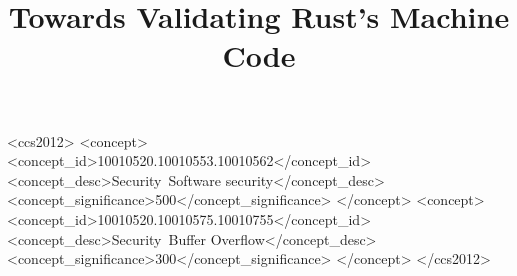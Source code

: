 \documentclass[sigconf]{acmart}
\begin{document}
\title{Towards Validating Rust's Machine Code}
\iffalse
  \author{Antonis Louca}
  \email{louca.antonis@ucy.ac.cy}
  \authornotemark[1]

  \affiliation{%
    \institution{University of Cyprus}
  }

  \author{Elias Athanasopoulos}
  \email{athanasopoulos.elias@ucy.ac.cy}
  \authornotemark[2]
  \affiliation{%
    \institution{University of Cyprus}
  }
\fi



\begin{abstract}
  
\end{abstract}

\iffalse
  \begin{CCSXML}
    <ccs2012>
    <concept>
    <concept_id>10010520.10010553.10010562</concept_id>
    <concept_desc>Security~Software security</concept_desc>
    <concept_significance>500</concept_significance>
    </concept>
    <concept>
    <concept_id>10010520.10010575.10010755</concept_id>
    <concept_desc>Security~Buffer Overflow</concept_desc>
    <concept_significance>300</concept_significance>
    </concept>
    </ccs2012>
  \end{CCSXML}
\end{document}
